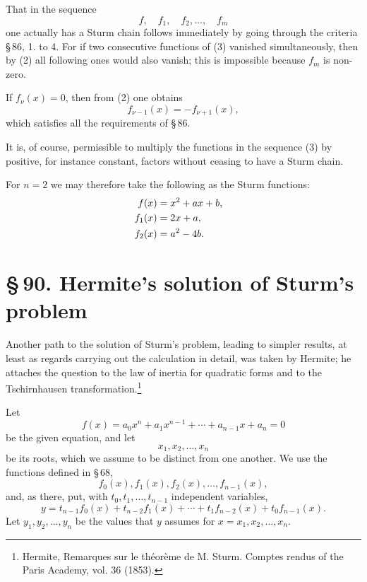 \documentclass[11pt]{article}
\providecommand{\sect}[2]{\section*{\S\,#1. #2}}
\begin{document}
That in the sequence
\begin{equation}
        f,
        \quad f_1,
        \quad f_2,
        \ldots,
        \quad f_m
\tag{3}
\end{equation}
one actually has a Sturm chain follows immediately by going through the criteria \S\,86, 1. to 4. For if two consecutive functions of (3) vanished simultaneously, then by (2) all following ones would also vanish; this is impossible because $f_m$ is non-zero.

If $f_\nu(x)=0$, then from (2) one obtains
\[
        f_{\nu-1}(x)=-f_{\nu+1}(x),
\]
which satisfies all the requirements of \S\,86.

It is, of course, permissible to multiply the functions in the sequence (3) by positive, for instance constant, factors without ceasing to have a Sturm chain.

For $n=2$ we may therefore take the following as the Sturm functions:
\[
\begin{aligned}
        f(x)&=x^2+ax+b,\cr
        f_1(x)&=2x+a,\cr
        f_2(x)&=a^2-4b.
\end{aligned}
\]

\clearpage
\sect{90}{Hermite's solution of Sturm's problem}

Another path to the solution of Sturm's problem, leading to simpler results, at least as regards carrying out the calculation in detail, was taken by Hermite; he attaches the question to the law of inertia for quadratic forms and to the Tschirnhausen transformation.\footnote{Hermite, Remarques sur le théorème de M. Sturm. Comptes rendus of the Paris Academy, vol. 36 (1853).}

Let
\begin{equation}
f(x)=a_0x^n+a_1x^{n-1}+\cdots+a_{n-1}x+a_n=0
\tag{1}
\end{equation}
be the given equation, and let
\begin{equation}
x_1,x_2,\ldots,x_n
\tag{2}
\end{equation}
be its roots, which we assume to be distinct from one another. We use the functions defined in \S\,68,
\begin{equation}
f_0(x),f_1(x),f_2(x),\ldots,f_{n-1}(x),
\tag{3}
\end{equation}
and, as there, put, with $t_0,t_1,\ldots,t_{n-1}$ independent variables,
\begin{equation}
y=t_{n-1}f_0(x)+t_{n-2}f_1(x)+\cdots+t_1f_{n-2}(x)+t_0f_{n-1}(x).
\tag{4}
\end{equation}
Let $y_1,y_2,\ldots,y_n$ be the values that $y$ assumes for $x=x_1,x_2,\ldots,x_n$.
\end{document}
